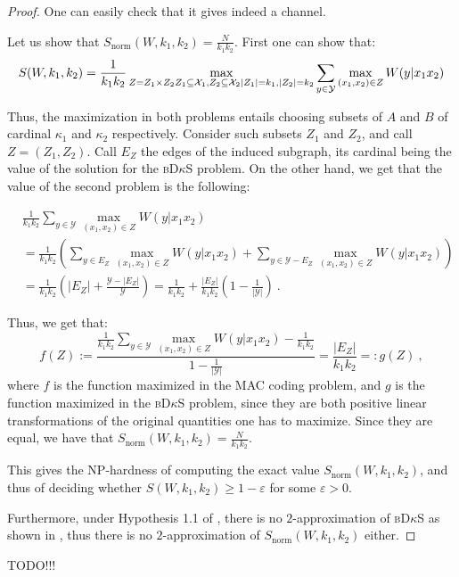 \begin{proof}
One can easily check that it gives indeed a channel.

Let us show that $S_{\text{norm}}(W,k_1,k_2) = \frac{N}{k_1k_2}$. First one can show that:
\[ S(W,k_1,k_2) = \frac{1}{k_1k_2}\max_{Z = Z_1 \times Z_2\\ Z_1 \subseteq \mathcal{X}_1, Z_2 \subseteq \mathcal{X}_2\\ |Z_1|=k_1,|Z_2|=k_2}\sum_{y \in \mathcal{Y}} \max_{(x_1,x_2) \in Z}W(y|x_1x_2)\]

Thus, the maximization in both problems entails choosing subsets of $A$ and $B$ of cardinal $\kappa_1$ and $\kappa_2$ respectively. Consider such subsets $Z_1$ and $Z_2$, and call $Z=(Z_1,Z_2)$. Call $E_Z$ the edges of the induced subgraph, its cardinal being the value of the solution for the \textsc{bD$\kappa$S} problem. On the other hand, we get that the value of the second problem is the following:

\begin{equation}
  \begin{aligned}
    &\frac{1}{k_1k_2}\sum_{y \in \mathcal{Y}} \max_{(x_1,x_2) \in Z}W(y|x_1x_2)\\
    &= \frac{1}{k_1k_2}\left(\sum_{y \in E_Z} \max_{(x_1,x_2) \in Z}W(y|x_1x_2) + \sum_{y \in \mathcal{Y}-E_Z} \max_{(x_1,x_2) \in Z}W(y|x_1x_2)\right)\\
    &= \frac{1}{k_1k_2}\left(|E_Z| + \frac{\mathcal{Y} - |E_Z|}{\mathcal{Y}}\right) = \frac{1}{k_1k_2} + \frac{|E_Z|}{k_1k_2} \left(1-\frac{1}{|\mathcal{Y}|}\right) \ .
  \end{aligned}
\end{equation}

Thus, we get that:
\[ f(Z) :=  \frac{\frac{1}{k_1k_2}\sum_{y \in \mathcal{Y}} \max_{(x_1,x_2) \in Z}W(y|x_1x_2) - \frac{1}{k_1k_2}}{1-\frac{1}{|\mathcal{Y}|}} = \frac{|E_Z|}{k_1k_2} =: g(Z) \ , \]
where $f$ is the function maximized in the MAC coding problem, and $g$ is the function maximized in the \textsc{bD$\kappa$S} problem, since they are both positive linear transformations of the original quantities one has to maximize. Since they are equal, we have that $S_{\text{norm}}(W,k_1,k_2) = \frac{N}{k_1k_2}$.

This gives the {\rm NP}-hardness of computing the exact value $S_{\text{norm}}(W,k_1,k_2)$, and thus of deciding whether $S(W,k_1,k_2) \geq 1 - \varepsilon$ for some $\varepsilon > 0$.

Furthermore, under Hypothesis 1.1 of \cite{AAMMW11}, there is no $2$-approximation of \textsc{bD$\kappa$S} as shown in \cite{AAMMW11}, thus there is no $2$-approximation of $S_{\text{norm}}(W,k_1,k_2)$ either.
\end{proof}
TODO!!!

